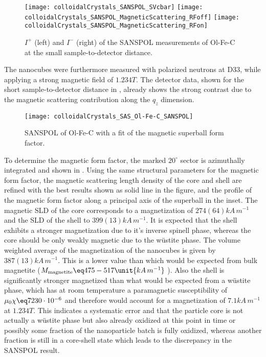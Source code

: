 \documentclass[\main/dresen_thesis.tex]{subfiles}
\begin{document}
    \begin{figure}[tb]
      \centering
      \texttt{[image: colloidalCrystals\_SANSPOL\_SVcbar]}
      \texttt{[image: colloidalCrystals\_SANSPOL\_MagneticScattering\_RFoff]}
      \texttt{[image: colloidalCrystals\_SANSPOL\_MagneticScattering\_RFon]}
      \caption{\label{fig:colloidalCrystals:nanoparticle:sanspolDetectorImage}$I^{+}$ (left) and $I^{-}$ (right) of the SANSPOL measurements of Ol-Fe-C at the small sample-to-detector distance.}
    \end{figure}

    The nanocubes were furthermore measured with polarized neutrons at D33, while applying a strong magnetic field of $1.234 \unit{T}$.
    The detector data, shown for the short sample-to-detector distance in , already shows the strong contrast due to the magnetic scattering contribution along the $q_z$ dimension.

    \begin{figure}[htbp]
      \centering
      \texttt{[image: colloidalCrystals\_SAS\_Ol-Fe-C\_SANSPOL]}
      \caption{\label{fig:colloidalCrystals:nanoparticle:sanspol}SANSPOL of Ol-Fe-C with a fit of the magnetic superball form factor.}
    \end{figure}

    To determine the magnetic form factor, the marked $20 ^\circ$ sector is azimuthally integrated and shown in .
    Using the same structural parameters for the magnetic form factor, the magnetic scattering length density of the core and shell are refined with the best results shown as solid line in the figure, and the profile of the magnetic form factor along a principal axis of the superball in the inset.
    The magnetic SLD of the core corresponds to a magnetization of $274(64) \unit{kA \, m^{-1}}$ and the SLD of the shell to $399(13) \unit{kA \, m^{-1}}$.
    It is expected that the shell exhibits a stronger magnetization due to it's inverse spinell phase, whereas the core should be only weakly magnetic due to the w\"ustite phase.
    The volume weighted average of the magnetization of the nanocubes is given by $387(13) \unit{kA \, m^{-1}}$.
    This is a lower value than which would be expected from bulk magnetite ($M_\mathrm{magnetite} \eq 475 - 517 \unit{kA \, m^{-1}}$ \cite{Cornell_2003_Their, Handley_2000_Moder}).
    Also the shell is significantly stronger magnetized than what would be expected from a w\"ustite phase, which has at room temperature a paramagnetic susceptibility of $\mu_0 \chi \eq 7230 \cdot 10^{-6}$ \cite{Lide_2004_Handb} and therefore would account for a magnetization of $7.1 \unit{kA \, m^{-1}}$ at $1.234 \unit{T}$.
    This indicates a systematic error and that the particle core is not actually a w\"ustite phase but also already oxidized at this point in time or possibly some fraction of the nanoparticle batch is fully oxidized, whereas another fraction is still in a core-shell state which leads to the discrepancy in the SANSPOL result.
\end{document}
